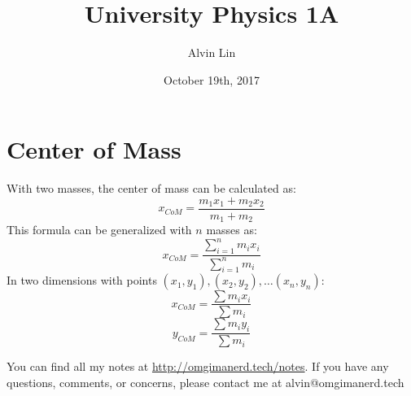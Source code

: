 \documentclass[letterpaper, 12pt]{math}
\title{University Physics 1A}
\author{Alvin Lin}
\date{October 19th, 2017}
\begin{document}
\maketitle

\section*{Center of Mass}
With two masses, the center of mass can be calculated as:
\[ x_{CoM} = \frac{m_1x_1+m_2x_2}{m_1+m_2} \]
This formula can be generalized with \( n \) masses as:
\[ x_{CoM} = \frac{\sum_{i=1}^{n}m_ix_i}{\sum_{i=1}^{n}m_i} \]
In two dimensions with points \( (x_1,y_1),(x_2,y_2),\dots(x_n,y_n) \):
\[ x_{CoM} = \frac{\sum m_ix_i}{\sum m_i} \]
\[ y_{CoM} = \frac{\sum m_iy_i}{\sum m_i} \]

\begin{center}
  You can find all my notes at \url{http://omgimanerd.tech/notes}. If you have
  any questions, comments, or concerns, please contact me at
  alvin@omgimanerd.tech
\end{center}
\end{document}
